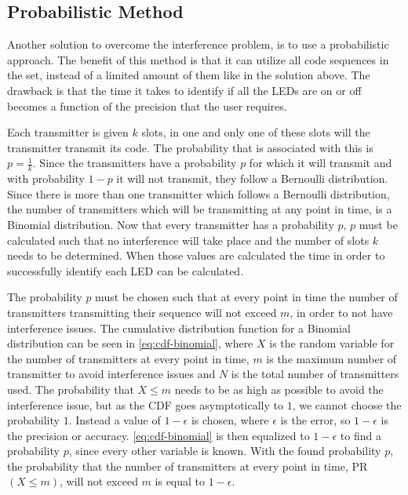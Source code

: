 \subsection{Probabilistic Method}
\label{subsec:probabilistic-method-modulation}



Another solution to overcome the interference problem, is to use a probabilistic approach.
The benefit of this method is that it can utilize all code sequences in the set, instead of a limited amount of them like in the solution above.
The drawback is that the time it takes to identify if all the LEDs are on or off becomes a function of the precision that the user requires.

Each transmitter is given $k$ slots, in one and only one of these slots will the transmitter transmit its code.
The probability that is associated with this is $p = \frac{1}{k}$.
Since the transmitters have a probability $p$ for which it will transmit and with probability $1 - p$ it will not transmit, they follow a Bernoulli distribution.
Since there is more than one transmitter which follows a Bernoulli distribution, the number of transmitters which will be transmitting at any point in time, is a Binomial distribution.
Now that every transmitter has a probability $p$, $p$ must be calculated such that no interference will take place and the number of slots $k$ needs to be determined.
When those values are calculated the time in order to successfully identify each LED can be calculated.




The probability $p$ must be chosen such that at every point in time the number of transmitters transmitting their sequence will not exceed $m$, in order to not have interference issues.
The cumulative distribution function for a Binomial distribution can be seen in \autoref{eq:cdf-binomial}, where $X$ is the random variable for the number of transmitters at every point in time, $m$ is the maximum number of transmitter to avoid interference issues and $N$ is the total number of transmitters used.
The probability that $X \le m$ needs to be as high as possible to avoid the interference issue, but as the CDF goes asymptotically to $1$, we cannot choose the probability $1$.
Instead a value of $1 - \epsilon$ is chosen, where $\epsilon$ is the error, so $1 - \epsilon$ is the precision or accuracy.
\autoref{eq:cdf-binomial} is then equalized to $1 - \epsilon$ to find a probability $p$, since every other variable is known.
With the found probability $p$, the probability that the number of transmitters at every point in time, PR$(X \le m)$, will not exceed $m$ is equal to $1 - \epsilon$.


